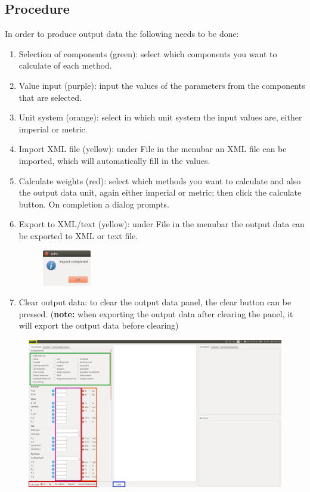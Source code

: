 \clearpage
\subsection{Procedure}
\noindent In order to produce output data the following needs to be done:
\begin{enumerate}
    \item Selection of components (green): select which components you want to calculate of each method.
    \item Value input (purple): input the values of the parameters from the components that are selected.
    \item Unit system (orange): select in which unit system the input values are, either imperial or metric.
    \item Import XML file (yellow): under File in the menubar an XML file can be imported, which will automatically fill in the values.
    \item Calculate weights (red): select which methods you want to calculate and also the output data unit, again either imperial or metric; then click the calculate button. On completion a dialog prompts.
    \item Export to XML/text (yellow): under File in the menubar the output data can be exported to XML or text file.
    \begin{figure}[ht]
    \centering
    \includegraphics[width=0.2\textwidth]{image/export_complete.png}
    \end{figure}

    \item Clear output data: to clear the output data panel, the clear button can be pressed. (\textbf{note:} when exporting the output data after clearing the panel, it will export the output data before clearing)
\end{enumerate}

\begin{figure}[ht]
\includegraphics[width=1\textwidth]{image/gui_startup_boxes.png}
\end{figure}

